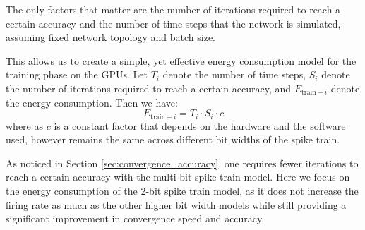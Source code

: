         The only factors that matter are the number of iterations required to reach a certain accuracy and the number of time steps that the network is simulated, assuming fixed network topology and batch size. 
    
        This allows us to create a simple, yet effective energy consumption model for the training phase on the GPUs. Let $T_i$ denote the number of time steps, $S_i$ denote the number of iterations required to reach a certain accuracy, and $E_{\text{train}-i}$ denote the energy consumption. Then we have:
        \begin{equation}
            E_{\text{train}-i} = T_i \cdot S_i \cdot c
        \end{equation}
        where as $c$ is a constant factor that depends on the hardware and the software used, however remains the same across different bit widths of the spike train. 
    
        As noticed in Section \ref{sec:convergence_accuracy}, one requires fewer iterations to reach a certain accuracy with the multi-bit spike train model. Here we focus on the energy consumption of the 2-bit spike train model, as it does not increase the firing rate as much as the other higher bit width models while still providing a significant improvement in convergence speed and accuracy. 

